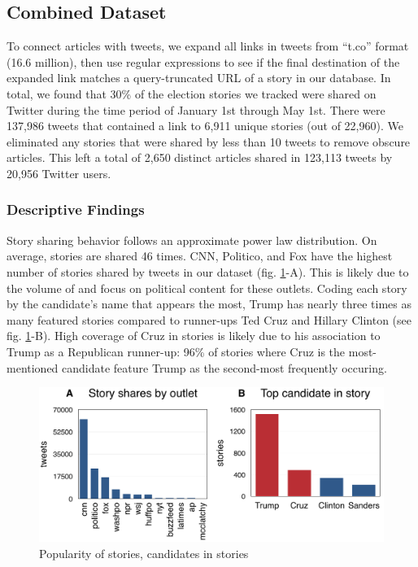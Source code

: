 \documentclass[letterpaper]{article}
\begin{document}
\subsection{Combined Dataset}
To connect articles with tweets, we expand all links in tweets from ``t.co'' format (16.6 million), then use regular expressions to see if the final destination of the expanded link matches a query-truncated URL of a story in our database. In total, we found that 30\% of the election stories we tracked were shared on Twitter during the time period of January 1st through May 1st. There were 137,986 tweets that contained a link to 6,911 unique stories (out of 22,960). We eliminated any stories that were shared by less than 10 tweets to remove obscure articles. This left a total of 2,650 distinct articles shared in 123,113 tweets by 20,956 Twitter users.

\subsubsection{Descriptive Findings}
Story sharing behavior follows an approximate power law distribution. On average, stories are shared 46 times. CNN, Politico, and Fox have the highest number of stories shared by tweets in our dataset (fig. \ref{fig:story-stats}-A). This is likely due to the volume of and focus on political content for these outlets. Coding each story by the candidate's name that appears the most, Trump has nearly three times as many featured stories compared to runner-ups Ted Cruz and Hillary Clinton (see fig. \ref{fig:story-stats}-B). High coverage of Cruz in stories is likely due to his association to Trump as a Republican runner-up: 96\% of stories where Cruz is the most-mentioned candidate feature Trump as the second-most frequently occuring.

\begin{figure}[t!]
\centering 
  \includegraphics[width=\linewidth]{story-stats}  
  \caption{Popularity of stories, candidates in stories
    \label{fig:story-stats}}
\end{figure}  
\end{document}
